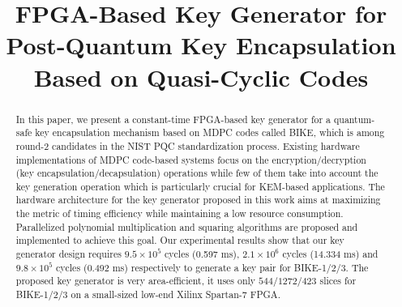 \documentclass[runningheads]{llncs}
\begin{document}
%
\title{FPGA-Based Key Generator for Post-Quantum Key Encapsulation Based on Quasi-Cyclic Codes}
%
%





\maketitle              %
%


\begin{abstract}
In this paper, we present a constant-time FPGA-based key generator for a
quantum-safe key encapsulation mechanism based on MDPC codes
called BIKE,
which is among round-2 candidates in the NIST PQC standardization process.
Existing hardware implementations of MDPC code-based systems
focus on the encryption/decryption (key encapsulation/decapsulation)
operations while few of them take into account
the key generation operation which is particularly crucial for
KEM-based applications.
The hardware architecture for the key generator
proposed in this work
aims at maximizing the metric of timing efficiency
while maintaining a low resource consumption.
Parallelized polynomial multiplication and squaring 
algorithms are proposed
and implemented to achieve this goal.
Our experimental results show that our key generator design
requires $9.5\times 10^5$ cycles (0.597 ms),
$2.1\times 10^6$ cycles (14.334 ms) and $9.8\times 10^5$ cycles (0.492 ms)
respectively
to generate a key pair for BIKE-1/2/3.
The proposed key generator is very area-efficient,
it uses only $544/1272/423$ slices for BIKE-1/2/3 on
a small-sized low-end Xilinx Spartan-7 FPGA.

\end{abstract}
%
%
%
\end{document}
